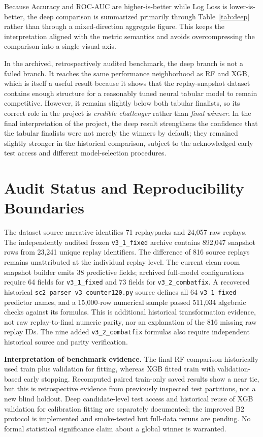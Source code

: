 \documentclass[11pt,a4paper]{article}
\begin{document}
Because Accuracy and ROC-AUC are higher-is-better while Log Loss is lower-is-better, the deep comparison is summarized primarily through Table~\ref{tab:deep} rather than through a mixed-direction aggregate figure. This keeps the interpretation aligned with the metric semantics and avoids overcompressing the comparison into a single visual axis.


In the archived, retrospectively audited benchmark, the deep branch is not a failed branch. It reaches the same performance neighborhood as RF and XGB, which is itself a useful result because it shows that the replay-snapshot dataset contains enough structure for a reasonably tuned neural tabular model to remain competitive. However, it remains slightly below both tabular finalists, so its correct role in the project is \emph{credible challenger} rather than \emph{final winner}. In the final interpretation of the project, the deep result strengthens the confidence that the tabular finalists were not merely the winners by default; they remained slightly stronger in the historical comparison, subject to the acknowledged early test access and different model-selection procedures.

\section{Audit Status and Reproducibility Boundaries}
\label{sec:b5audit}
The dataset source narrative identifies 71 replaypacks and 24,057 raw replays.
The independently audited frozen \texttt{v3\_1\_fixed} archive contains
892,047 snapshot rows from 23,241 unique replay identifiers. The difference
of 816 source replays remains unattributed at the individual replay level.
The current clean-room snapshot builder emits 38 predictive fields; archived
full-model configurations require 64 fields for \texttt{v3\_1\_fixed} and
73 fields for \texttt{v3\_2\_combatfix}. A recovered historical
\texttt{sc2\_parser\_v3\_counter120.py} source defines all 64
\texttt{v3\_1\_fixed} predictor names, and a 15,000-row numerical
sample passed 511,034 algebraic checks against its formulas. This is
additional historical transformation evidence, not raw replay-to-final
numeric parity, nor an explanation of the 816 missing raw replay IDs.
The nine added \texttt{v3\_2\_combatfix} formulas also require
independent historical source and parity verification.

\textbf{Interpretation of benchmark evidence.}
The final RF comparison historically used train plus validation for fitting,
whereas XGB fitted train with validation-based early stopping. Recomputed
paired train-only saved results show a near tie, but this is retrospective
evidence from previously inspected test partitions, not a new blind holdout.
Deep candidate-level test access and historical reuse of XGB validation for
calibration fitting are separately documented; the improved B2 protocol is
implemented and smoke-tested but full-data reruns are pending. No formal
statistical significance claim about a global winner is warranted.
\end{document}
